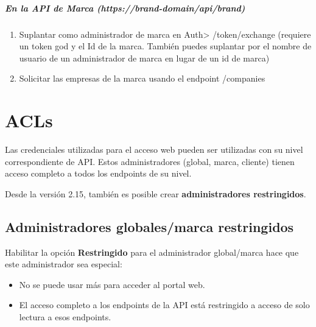 \documentclass[letterpaper,10pt,spanish]{sphinxmanual}
\begin{document}
\paragraph{En la API de Marca (https://brand-domain/api/brand)}
\begin{enumerate}
\item {} 
Suplantar como administrador de marca en Auth\textgreater{} /token/exchange (requiere un token god y el Id de la marca. También puedes suplantar por el nombre de usuario de un administrador de marca en lugar de un id de marca)

\item {} 
Solicitar las empresas de la marca usando el endpoint /companies

\end{enumerate}


\chapter{ACLs}
\label{api_rest/acls:acls}\label{api_rest/acls::doc}\label{api_rest/acls:id1}
Las credenciales utilizadas para el acceso web pueden ser utilizadas con su nivel correspondiente de API. Estos administradores (global, marca, cliente) tienen acceso completo a todos los endpoints de su nivel.

Desde la versión 2.15, también es posible crear \textbf{administradores restringidos}.


\section{Administradores globales/marca restringidos}
\label{api_rest/acls:restricted-global-brand-administrators}
Habilitar la opción \textbf{Restringido} para el administrador global/marca hace que este administrador sea especial:
\begin{itemize}
\item {} 
No se puede usar más para acceder al portal web.

\item {} 
El acceso completo a los endpoints de la API está restringido a acceso de solo lectura a esos endpoints.

\end{itemize}
\end{document}
